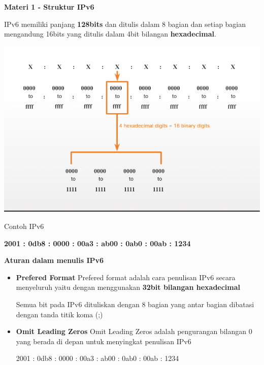 \documentclass{article}
\begin{document}
    \begin{flushleft}
        \textbf{Materi 1 - Struktur IPv6}
        \newline

        IPv6 memiliki panjang \textbf{128bits} dan ditulis dalam 8 bagian dan setiap bagian mengandung 16bits yang ditulis dalam 4bit bilangan \textbf{hexadecimal}.

        \begin{center}
            \includegraphics[scale=0.5]{1-1.png}
        \end{center}
        
        Contoh IPv6 
        \begin{center}
            \textbf{2001 : 0db8 : 0000 : 00a3 : ab00 : 0ab0 : 00ab : 1234}
            \newline
        \end{center}

        \textbf{Aturan dalam menulis IPv6}
        \begin{itemize}
            \item[] \textbf{Prefered Format} \newline
            Prefered format adalah cara penulisan IPv6 secara menyeluruh yaitu dengan menggunakan \textbf{32bit bilangan hexadecimal}
            \begin{center}
                    
            \end{center}
            Semua bit pada IPv6 dituliskan dengan 8 bagian yang antar bagian dibatasi dengan tanda titik koma (;)

            \item[] \textbf{Omit Leading Zeros} \newline
            Omit Leading Zeros adalah pengurangan bilangan 0 yang berada di depan untuk menyingkat penulisan IPv6
            \begin{center}
                2001 : 0db8 : 0000 : 00a3 : ab00 : 0ab0 : 00ab : 1234
            \end{center}
            

\end{itemize}
\end{flushleft}
\end{document}
